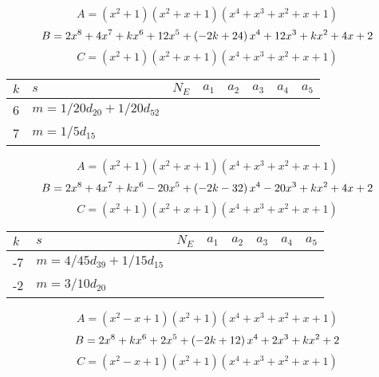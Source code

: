 \documentclass{amsart}
\begin{document}
$$A=(x^2
 + 1)(x^2
 + x
 + 1)(x^4
 + x^3
 + x^2
 + x
 + 1)$$
$$B=2\*x^8
 + 4\*x^7
 + k\*x^6
 + 12\*x^5
 + \left(-2\*k
 + 24\right) \*x^4
 + 12\*x^3
 + k\*x^2
 + 4\*x
 + 2$$
$$C=(x^2
 + 1)(x^2
 + x
 + 1)(x^4
 + x^3
 + x^2
 + x
 + 1)$$
\begin{longtable}{|l|l|l|lllll|}
\hline
$k$ & $s$ & $N_E$ & $a_1$ & $a_2$ & $a_3$ & $a_4$ & $a_5$\\
\hline
6&$m=1/20d_{20}+1/20d_{52}$&&\multicolumn{5}{c|}{}\\
7&$m=1/5d_{15}$&&\multicolumn{5}{c|}{}\\
\hline
\end{longtable}
$$A=(x^2
 + 1)(x^2
 + x
 + 1)(x^4
 + x^3
 + x^2
 + x
 + 1)$$
$$B=2\*x^8
 + 4\*x^7
 + k\*x^6
 - 20\*x^5
 + \left(-2\*k
 - 32\right) \*x^4
 - 20\*x^3
 + k\*x^2
 + 4\*x
 + 2$$
$$C=(x^2
 + 1)(x^2
 + x
 + 1)(x^4
 + x^3
 + x^2
 + x
 + 1)$$
\begin{longtable}{|l|l|l|lllll|}
\hline
$k$ & $s$ & $N_E$ & $a_1$ & $a_2$ & $a_3$ & $a_4$ & $a_5$\\
\hline
-7&$m=4/45d_{39}+1/15d_{15}$&&\multicolumn{5}{c|}{}\\
-2&$m=3/10d_{20}$&&\multicolumn{5}{c|}{}\\
\hline
\end{longtable}
$$A=(x^2
 - x
 + 1)(x^2
 + 1)(x^4
 + x^3
 + x^2
 + x
 + 1)$$
$$B=2\*x^8
 + k\*x^6
 + 2\*x^5
 + \left(-2\*k
 + 12\right) \*x^4
 + 2\*x^3
 + k\*x^2
 + 2$$
$$C=(x^2
 - x
 + 1)(x^2
 + 1)(x^4
 + x^3
 + x^2
 + x
 + 1)$$
\end{document}
